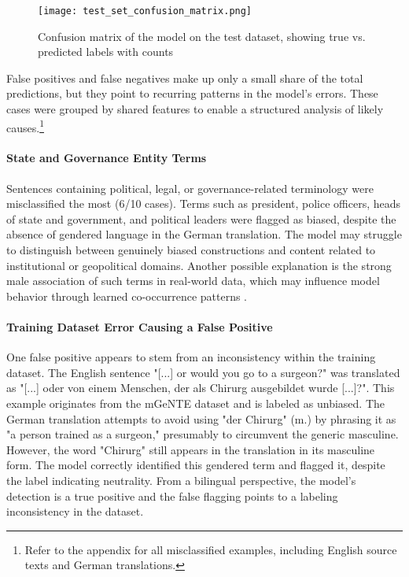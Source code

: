         \begin{figure}[ht]
            \centering
            \texttt{[image: test\_set\_confusion\_matrix.png]}
            \caption[Confusion matrix on the test dataset]{Confusion matrix of the model on the test dataset, showing true vs. predicted labels with counts}
            \label{fig:test_confusion_matrix}
        \end{figure}

    False positives and false negatives make up only a small share of the total predictions, but they point to recurring patterns in the model’s errors. These cases were grouped by shared features to enable a structured analysis of likely causes.\footnote{Refer to the appendix for all misclassified examples, including English source texts and German translations.}

    \paragraph{State and Governance Entity Terms}

    Sentences containing political, legal, or governance-related terminology were misclassified the most (6/10 cases). Terms such as president, police officers, heads of state and government, and political leaders were flagged as biased, despite the absence of gendered language in the German translation. The model may struggle to distinguish between genuinely biased constructions and content related to institutional or geopolitical domains. Another possible explanation is the strong male association of such terms in real-world data, which may influence model behavior through learned co-occurrence patterns \parencite{kroeberItsLongWay2022}.

    \paragraph{Training Dataset Error Causing a False Positive}

    One false positive appears to stem from an inconsistency within the training dataset. The English sentence "[...] or would you go to a surgeon?" was translated as "[...] oder von einem Menschen, der als Chirurg ausgebildet wurde [...]?". This example originates from the mGeNTE dataset and is labeled as unbiased. The German translation attempts to avoid using "der Chirurg" (m.) by phrasing it as "a person trained as a surgeon," presumably to circumvent the generic masculine. However, the word "Chirurg" still appears in the translation in its masculine form. The model correctly identified this gendered term and flagged it, despite the label indicating neutrality. From a bilingual perspective, the model’s detection is a true positive and the false flagging points to a labeling inconsistency in the dataset.

